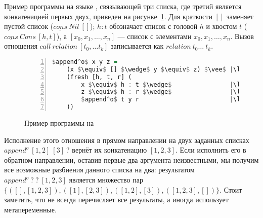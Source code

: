 Пример программы на языке \miniKanren{}, связывающей три списка, где третий является конкатенацией первых двух, приведен на рисунке~\ref{lst:appendo}. 
Для краткости $[]$ заменяет пустой список ($\underline{cons} \ Nil \ []$); $h : t$ обозначает список с головой $h$ и хвостом $t$ ($\underline{cons} \ Cons \ [h, t]$), а $[x_0, x_1, \dots, x_n]$ --- список с элементами $x_0, x_1, \dots, x_n$. 
Вызов отношения $\underline{call} \ relation \ [t_0, \dots t_k]$ записывается как $relation \ t_0 \dots \ t_k$.

\begin{figure}[h!]
  \begin{center}
  \begin{minipage}{0.5\textwidth}
  \begin{lstlisting}[language=Haskell, frame=single, numbers=left,numberstyle=\small, escapechar=|]
  $append^o$ x y z =
    (x $\equiv$ [] $\wedge$ y $\equiv$ z) $\vee$ |\label{line:appendo2}|
    (fresh [h, t, r] (
        x $\equiv$ h : t $\wedge$                |\label{line:appendo4}|
        z $\equiv$ h : r $\wedge$                |\label{line:appendo5}|
        $append^o$ t y r                         |\label{line:appendo6}|
    ))
    \end{lstlisting}
  \end{minipage}
  \end{center}
  \caption{Пример программы на \miniKanren{}}
  \label{lst:appendo}
\end{figure}

Исполнение этого отношения в прямом направлении на двух заданных списках $append^o \ [1,2] \ [3] \ ?$ вернёт их конкатенацию $[1,2,3]$.
Если исполнить его в обратном направлении, оставив первые два аргумента неизвестными, мы получим все возможные разбиения данного списка на два: результатом $append^o \ ? \ ? \ [1,2,3]$ является множество пар $\{([],[1,2,3]), ([1], [2,3]), ([1,2], [3]), ([1,2,3], [])\}$.
Стоит заметить, что \miniKanren{} не всегда перечисляет все результаты, а иногда использует метапеременные.
